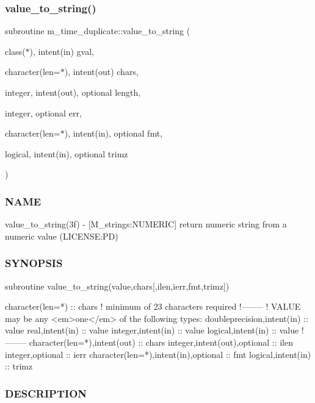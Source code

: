 \subsubsection{\texorpdfstring{value\+\_\+to\+\_\+string()}{value\_to\_string()}}
{\footnotesize\ttfamily subroutine m\+\_\+time\+\_\+duplicate\+::value\+\_\+to\+\_\+string (\begin{DoxyParamCaption}\item[{class($\ast$), intent(in)}]{gval,  }\item[{character(len=$\ast$), intent(out)}]{chars,  }\item[{integer, intent(out), optional}]{length,  }\item[{integer, optional}]{err,  }\item[{character(len=$\ast$), intent(in), optional}]{fmt,  }\item[{logical, intent(in), optional}]{trimz }\end{DoxyParamCaption})}



\subsubsection*{N\+A\+ME}

value\+\_\+to\+\_\+string(3f) -\/ \mbox{[}M\+\_\+strings\+:N\+U\+M\+E\+R\+IC\mbox{]} return numeric string from a numeric value (L\+I\+C\+E\+N\+SE\+:PD) 

\subsubsection*{S\+Y\+N\+O\+P\+S\+IS}

\begin{DoxyVerb}subroutine value_to_string(value,chars[,ilen,ierr,fmt,trimz])

 character(len=*) :: chars  ! minimum of 23 characters required
 !--------
 ! VALUE may be any <em>one</em> of the following types:
 doubleprecision,intent(in)               :: value
 real,intent(in)                          :: value
 integer,intent(in)                       :: value
 logical,intent(in)                       :: value
 !--------
 character(len=*),intent(out)             :: chars
 integer,intent(out),optional             :: ilen
 integer,optional                         :: ierr
 character(len=*),intent(in),optional     :: fmt
 logical,intent(in)                       :: trimz
\end{DoxyVerb}
 \subsubsection*{D\+E\+S\+C\+R\+I\+P\+T\+I\+ON}

